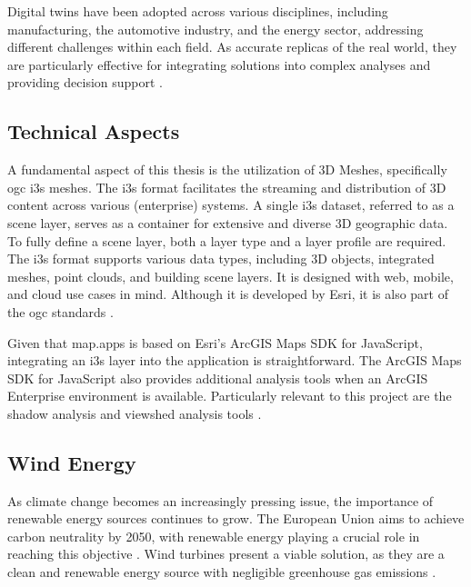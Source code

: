 \documentclass[11pt, titlepage, a4paper]{scrartcl}
\begin{document}
\begin{linenumbers}
    Digital twins have been adopted across various disciplines, including manufacturing, the automotive industry, and the energy sector, addressing different challenges within each field. As accurate replicas of the real world, they are particularly effective for integrating solutions into complex analyses and providing decision support \cite{pylianidisIntroducingDigitalTwins2021}.

    \subsection{Technical Aspects}
    A fundamental aspect of this thesis is the utilization of 3D Meshes, specifically \gls{ogc} \gls{i3s} meshes. The \gls{i3s} format facilitates the streaming and distribution of 3D content across various (enterprise) systems. A single \gls{i3s} dataset, referred to as a scene layer, serves as a container for extensive and diverse 3D geographic data. To fully define a scene layer, both a layer type and a layer profile are required. 
    The \gls{i3s} format supports various data types, including 3D objects, integrated meshes, point clouds, and building scene layers. It is designed with web, mobile, and cloud use cases in mind. Although it is developed by Esri, it is also part of the \gls{ogc} standards \cite{esriincI3sspec}.

    Given that map.apps is based on Esri's ArcGIS Maps SDK for JavaScript, integrating an \gls{i3s} layer into the application is straightforward. The ArcGIS Maps SDK for JavaScript also provides additional analysis tools when an ArcGIS Enterprise environment is available. Particularly relevant to this project are the shadow analysis \cite{esriincShadowCast} and viewshed analysis tools \cite{esriincGeoprocessingViewshedAnalysis}.

    \subsection{Wind Energy}
    As climate change becomes an increasingly pressing issue, the importance of renewable energy sources continues to grow. The European Union aims to achieve carbon neutrality by 2050, with renewable energy playing a crucial role in reaching this objective \cite{europeancommission.directorategeneralforclimateaction.GoingClimateneutral20502019}. Wind turbines present a viable solution, as they are a clean and renewable energy source with negligible greenhouse gas emissions \cite{pryorClimateChangeImpacts2020}.


\end{linenumbers}
\end{document}

